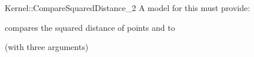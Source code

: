 \begin{ccRefFunctionObjectConcept}{Kernel::CompareSquaredDistance_2}
A model for this must provide:


      {compares the squared distance of points  and  to }

\ccRefines
{} (with three arguments)

\ccSeeAlso

 \\
 \\

\end{ccRefFunctionObjectConcept}
